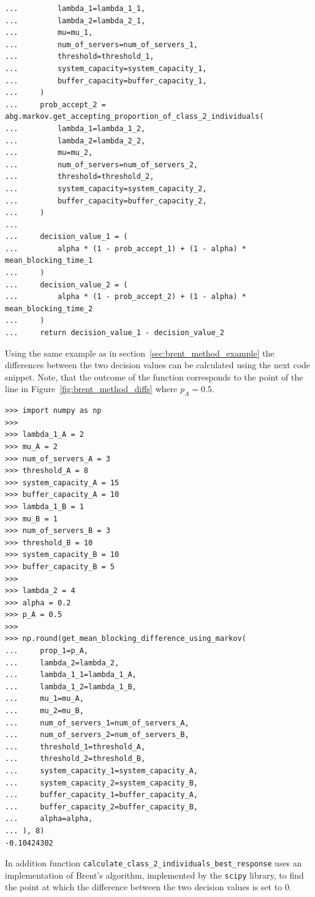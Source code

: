 \begin{lstlisting}[style=pystyle]
...         lambda_1=lambda_1_1,
...         lambda_2=lambda_2_1,
...         mu=mu_1,
...         num_of_servers=num_of_servers_1,
...         threshold=threshold_1,
...         system_capacity=system_capacity_1,
...         buffer_capacity=buffer_capacity_1,
...     )
...     prob_accept_2 = abg.markov.get_accepting_proportion_of_class_2_individuals(
...         lambda_1=lambda_1_2,
...         lambda_2=lambda_2_2,
...         mu=mu_2,
...         num_of_servers=num_of_servers_2,
...         threshold=threshold_2,
...         system_capacity=system_capacity_2,
...         buffer_capacity=buffer_capacity_2,
...     )
...
...     decision_value_1 = (
...         alpha * (1 - prob_accept_1) + (1 - alpha) * mean_blocking_time_1
...     )
...     decision_value_2 = (
...         alpha * (1 - prob_accept_2) + (1 - alpha) * mean_blocking_time_2
...     )
...     return decision_value_1 - decision_value_2

\end{lstlisting}

Using the same example as in section~\ref{sec:brent_method_example} the
differences between the two decision values can be calculated using the next
code snippet.
Note, that the outcome of the function corresponds to the point of the line in
Figure~\ref{fig:brent_method_diffs} where \(p_A = 0.5\).

\begin{lstlisting}[style=pystyle]
>>> import numpy as np
>>>
>>> lambda_1_A = 2
>>> mu_A = 2
>>> num_of_servers_A = 3
>>> threshold_A = 8
>>> system_capacity_A = 15
>>> buffer_capacity_A = 10
>>> lambda_1_B = 1
>>> mu_B = 1
>>> num_of_servers_B = 3
>>> threshold_B = 10
>>> system_capacity_B = 10
>>> buffer_capacity_B = 5
>>>
>>> lambda_2 = 4
>>> alpha = 0.2
>>> p_A = 0.5
>>>
>>> np.round(get_mean_blocking_difference_using_markov(
...     prop_1=p_A,
...     lambda_2=lambda_2,
...     lambda_1_1=lambda_1_A,
...     lambda_1_2=lambda_1_B,
...     mu_1=mu_A,
...     mu_2=mu_B,
...     num_of_servers_1=num_of_servers_A,
...     num_of_servers_2=num_of_servers_B,
...     threshold_1=threshold_A,
...     threshold_2=threshold_B,
...     system_capacity_1=system_capacity_A,
...     system_capacity_2=system_capacity_B,
...     buffer_capacity_1=buffer_capacity_A,
...     buffer_capacity_2=buffer_capacity_B,
...     alpha=alpha,
... ), 8)
-0.10424302

\end{lstlisting}

In addition function
\lstinline[style=pystyle]{calculate_class_2_individuals_best_response} uses
an implementation of Brent's algorithm, implemented by the
\lstinline[style=pystyle]{scipy} library, to find the point at which the
difference between the two decision values is set to 0.


